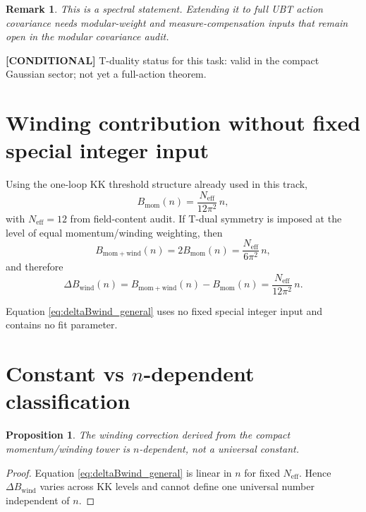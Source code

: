 \documentclass[11pt,a4paper]{article}
\newtheorem{proposition}{Proposition}
\newtheorem{remark}{Remark}
\newcommand{\cond}[1]{\textbf{[CONDITIONAL]} #1}
\begin{document}
\begin{remark}
This is a spectral statement. Extending it to full UBT action covariance needs
modular-weight and measure-compensation inputs that remain open in the modular
covariance audit.
\end{remark}

\cond{T-duality status for this task: valid in the compact Gaussian sector;
not yet a full-action theorem.}

\section{Winding contribution without fixed special integer input}

Using the one-loop KK threshold structure already used in this track,
\begin{equation}
B_{\mathrm{mom}}(n)=\frac{N_{\mathrm{eff}}}{12\pi^2}\,n,
\end{equation}
with $N_{\mathrm{eff}}=12$ from field-content audit. If T-dual symmetry is imposed
at the level of equal momentum/winding weighting, then
\begin{equation}
B_{\mathrm{mom+wind}}(n)=2B_{\mathrm{mom}}(n)
=\frac{N_{\mathrm{eff}}}{6\pi^2}\,n,
\end{equation}
and therefore
\begin{equation}
\Delta B_{\mathrm{wind}}(n)=B_{\mathrm{mom+wind}}(n)-B_{\mathrm{mom}}(n)
=\frac{N_{\mathrm{eff}}}{12\pi^2}\,n.
\label{eq:deltaBwind_general}
\end{equation}

Equation \eqref{eq:deltaBwind_general} uses no fixed special integer input and
contains no fit parameter.

\section{Constant vs $n$-dependent classification}

\begin{proposition}
The winding correction derived from the compact momentum/winding tower is
$n$-dependent, not a universal constant.
\end{proposition}

\begin{proof}
Equation \eqref{eq:deltaBwind_general} is linear in $n$ for fixed
$N_{\mathrm{eff}}$. Hence $\Delta B_{\mathrm{wind}}$ varies across KK levels and
cannot define one universal number independent of $n$.
\end{proof}
\end{document}
